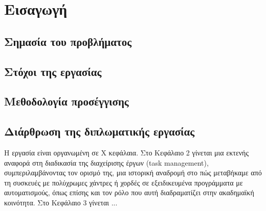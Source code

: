 \chapter{Εισαγωγή}


	\section{Σημασία του προβλήματος}

	\section{Στόχοι της εργασίας}

	\section{Μεθοδολογία προσέγγισης}

	\section{Διάρθρωση της διπλωματικής εργασίας}
            Η εργασία είναι οργανωμένη σε Χ κεφάλαια. Στο Κεφάλαιο 2 γίνεται μια εκτενής αναφορά στη διαδικασία της διαχείρισης έργων (task management), συμπεριλαμβάνοντας τον ορισμό της, μια ιστορική αναδρομή στο πώς μεταβήκαμε από τη συσκευές με πολύχρωμες χάντρες ή χορδές σε εξειδικευμένα προγράμματα με αυτοματισμούς, όπως επίσης και τον ρόλο που αυτή διαδραματίζει στην ακαδημαϊκή κοινότητα.
            Στο Κεφάλαιο 3 γίνεται ...